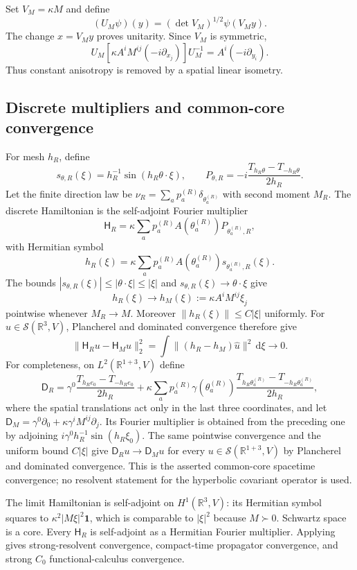 \documentclass[11pt]{article}
\theoremstyle{definition}
\theoremstyle{remark}
\newcommand{\R}{\mathbb R}
\newcommand{\one}{\mathbf 1}
\newcommand{\Ham}{\mathsf H}
\newcommand{\Dirac}{\mathsf D}
\newcommand{\dd}{\mathrm d}
\newcommand{\Sch}{\mathcal S}
\begin{document}
Set $V_M=\kappa M$ and define
\[
 (U_M\psi)(y)=(\det V_M)^{1/2}\psi(V_My).
\]
The change $x=V_My$ proves unitarity.  Since $V_M$ is symmetric,
\[
 U_M\left[\kappa A^iM^{ij}(-i\partial_{x_j})\right]U_M^{-1}
 =A^i(-i\partial_{y_i}).
\]
Thus constant anisotropy is removed by a spatial linear isometry.

\subsection{Discrete multipliers and common-core convergence}

For mesh $h_R$, define
\[
 s_{\theta,R}(\xi)=h_R^{-1}\sin(h_R\theta\cdot\xi),
 \qquad
 P_{\theta,R}=-i\frac{T_{h_R\theta}-T_{-h_R\theta}}{2h_R}.
\]
Let the finite direction law be
$\nu_R=\sum_a p_a^{(R)}\delta_{\theta_a^{(R)}}$ with second moment $M_R$.
The discrete Hamiltonian is the self-adjoint Fourier multiplier
\[
 \Ham_R=\kappa\sum_a p_a^{(R)}A(\theta_a^{(R)})P_{\theta_a^{(R)},R},
\]
with Hermitian symbol
\[
 h_R(\xi)=\kappa\sum_a p_a^{(R)}A(\theta_a^{(R)})
 s_{\theta_a^{(R)},R}(\xi).
\]
The bounds
$|s_{\theta,R}(\xi)|\le|\theta\cdot\xi|\le|\xi|$ and
$s_{\theta,R}(\xi)\to\theta\cdot\xi$ give
\[
 h_R(\xi)\longrightarrow
 h_M(\xi):=\kappa A^iM^{ij}\xi_j
\]
pointwise whenever $M_R\to M$.  Moreover $\|h_R(\xi)\|\le C|\xi|$ uniformly.
For $u\in\Sch(\R^3,V)$, Plancherel and dominated convergence therefore give
\[
 \|\Ham_Ru-\Ham_Mu\|_2^2
 =\int\|(h_R-h_M)\widehat u\|^2\,\dd\xi\longrightarrow0.
\]
For completeness, on $L^2(\R^{1+3},V)$ define
\[
 \Dirac_R
 =\gamma^0\frac{T_{h_Re_0}-T_{-h_Re_0}}{2h_R}
 +\kappa\sum_a p_a^{(R)}\gamma(\theta_a^{(R)})
       \frac{T_{h_R\theta_a^{(R)}}-T_{-h_R\theta_a^{(R)}}}{2h_R},
\]
where the spatial translations act only in the last three coordinates, and
let
$\Dirac_M=\gamma^0\partial_0+\kappa\gamma^iM^{ij}\partial_j$.
Its Fourier multiplier is obtained from the preceding one by adjoining
$i\gamma^0h_R^{-1}\sin(h_R\xi_0)$.  The same pointwise convergence and the
uniform bound $C|\xi|$ give
$\Dirac_Ru\to\Dirac_Mu$ for every $u\in\Sch(\R^{1+3},V)$ by Plancherel and
dominated convergence.  This is the asserted common-core spacetime
convergence; no resolvent statement for the hyperbolic covariant operator is
used.

The limit Hamiltonian is self-adjoint on $H^1(\R^3,V)$: its Hermitian symbol
squares to $\kappa^2|M\xi|^2\one$, which is comparable to $|\xi|^2$ because
$M\succ0$.  Schwartz space is a core.  Every $\Ham_R$ is self-adjoint as a
Hermitian Fourier multiplier.  Applying  gives
strong-resolvent convergence, compact-time propagator convergence, and strong
$C_0$ functional-calculus convergence.
\end{document}

